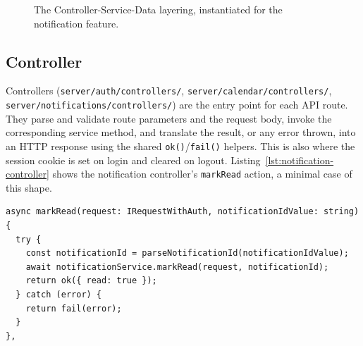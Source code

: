 \begin{figure}[htbp]
\begin{center}
\end{center}
\caption{The Controller-Service-Data layering, instantiated for the notification feature.}\label{fig:layers}
\end{figure}
\FloatBarrier

\subsection{Controller} \label{sec:backend-controller}
Controllers (\texttt{server/auth/controllers/}, \texttt{server/calendar/controllers/}, \texttt{server/notifications/controllers/}) are the entry point for each API route. They parse and validate route parameters and the request body, invoke the corresponding service method, and translate the result, or any error thrown, into an HTTP response using the shared \texttt{ok()}/\texttt{fail()} helpers. This is also where the session cookie is set on login and cleared on logout. Listing~\ref{lst:notification-controller} shows the notification controller's \texttt{markRead} action, a minimal case of this shape.

\noindent\begin{minipage}{\linewidth}
\begin{lstlisting}[caption={[Controller layer example.]{Controller layer example (\texttt{server/notifications/controllers/notification.controller.ts}).}}, label={lst:notification-controller}]
async markRead(request: IRequestWithAuth, notificationIdValue: string) {
  try {
    const notificationId = parseNotificationId(notificationIdValue);
    await notificationService.markRead(request, notificationId);
    return ok({ read: true });
  } catch (error) {
    return fail(error);
  }
},
\end{lstlisting}
\end{minipage}

